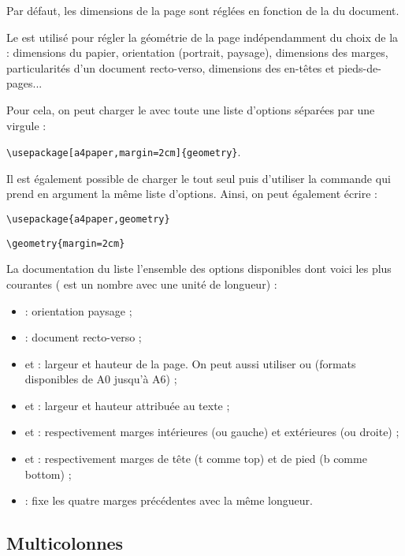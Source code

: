 \documentclass[10pt,french]{book}
\begin{document}
Par défaut, les dimensions de la page sont réglées en fonction de la  du document.\par
Le \package {} est utilisé pour régler la géométrie de la page indépendamment du choix de la  : dimensions du papier, orientation (portrait, paysage), dimensions des marges, particularités d'un document recto-verso, dimensions des en-têtes et pieds-de-pages...

Pour cela, on peut charger le \package avec toute une liste d'options séparées par une virgule :\par\medskip
\verb!\usepackage[a4paper,margin=2cm]{geometry}!.\medskip

Il est également possible de charger le \package tout seul puis d'utiliser la commande  qui prend en argument la même liste d'options. Ainsi, on peut également écrire :\par\medskip
\verb!\usepackage{a4paper,geometry}!\par
\verb!\geometry{margin=2cm}!\medskip

La documentation du \package {} liste l'ensemble des options disponibles dont voici les plus courantes ( est un nombre avec une unité de longueur) :
\begin{itemize}
    \item {} : orientation paysage ;
    \item {} : document recto-verso ;
    \item {} et  : largeur et hauteur de la page. On peut aussi utiliser  ou  (formats disponibles de A0 jusqu'à A6) ;
    \item {} et  : largeur et hauteur attribuée au texte ;
    \item {} et  : respectivement marges intérieures (ou gauche) et extérieures (ou droite) ;
    \item {} et  : respectivement marges de tête (t comme top) et de pied (b comme bottom) ;
    \item {} : fixe les quatre marges précédentes avec la même longueur.
\end{itemize}

\subsection{Multicolonnes}
\end{document}
